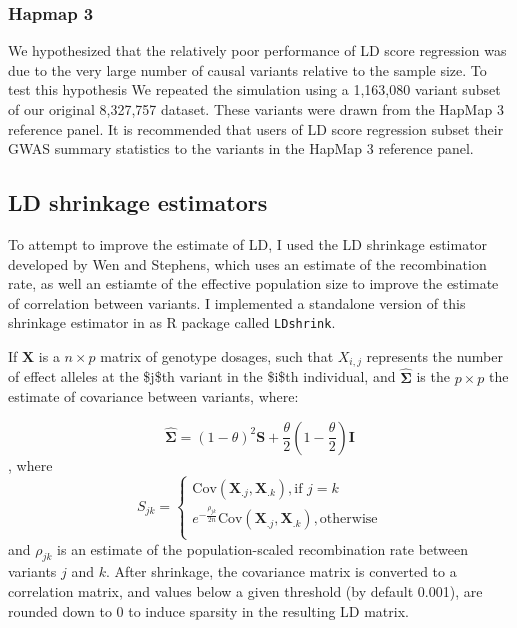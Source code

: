 \subsubsection{Hapmap 3}\label{sec:org0fa2c7f}

We hypothesized that the relatively poor performance of LD score regression was due to the very large number of causal variants relative to the sample size.  To test this hypothesis  We repeated the simulation using a 1,163,080 variant subset of our original 8,327,757 dataset.  These variants were drawn from the HapMap 3 reference panel\cite{hapmap3}.  It is recommended that users of LD score regression subset their GWAS summary statistics to the variants in the HapMap 3 reference panel\cite{ldsc}.  


\subsection{LD shrinkage estimators} 
To attempt to improve the estimate of LD, I used the LD shrinkage estimator developed by Wen and Stephens\cite{Wen_2010}, which uses an estimate of 
the recombination rate, as well an estiamte of the effective population size to improve the estimate of correlation between variants.
I implemented a standalone version of this shrinkage estimator in as R package called \texttt{LDshrink}. 

If \(\boldsymbol{X}\) is a \(n \times p\) matrix of genotype dosages, such that \(X_{i,j}\) represents the number of effect alleles at the \$j\$th variant in the \$i\$th individual, and \(\hat{\boldsymbol{\Sigma}}\) is the \(p \times p\)  the estimate of covariance between
variants, where:

\[\boldsymbol{\hat{\Sigma}} = (1-\theta)^2 \textbf{S}+\frac{\theta}{2} \left(1-\frac{\theta}{2}\right)\textbf{I}\],
where 
$$ S_{jk} = \begin{cases}
\text{Cov}(\boldsymbol{X}_{.j},\boldsymbol{X}_{.k}), \text{if } j=k \\
e^{-\frac{\rho_{jk}}{2n}}\text{Cov}(\boldsymbol{X}_{.j},\boldsymbol{X}_{.k}), \text{otherwise}\\
\end{cases} $$
and \(\rho_{jk}\) is an estimate of the population-scaled recombination rate between variants \(j\) and \(k\). After shrinkage, the covariance matrix is converted to a correlation matrix, and values below a given threshold (by default 0.001), are rounded down to 0 to induce sparsity in the resulting LD matrix.

